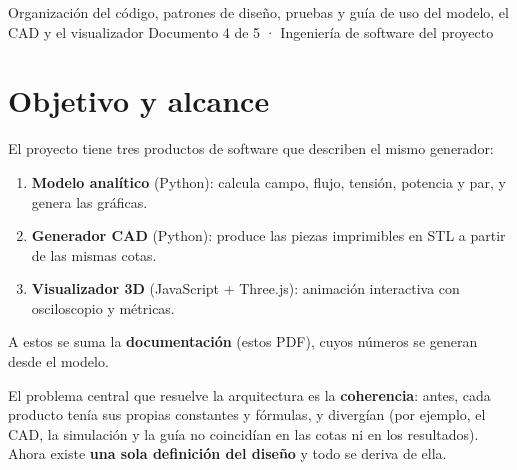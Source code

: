 \documentclass[11pt]{article}
\begin{document}
        {Organización del código, patrones de diseño, pruebas y guía de uso del modelo, el CAD y el visualizador}
        {Documento 4 de 5 · Ingeniería de software del proyecto}

\tableofcontents
\newpage

\section{Objetivo y alcance}
El proyecto tiene tres productos de software que describen el mismo generador:
\begin{enumerate}
  \item \textbf{Modelo analítico} (Python): calcula campo, flujo, tensión, potencia y par, y genera las gráficas.
  \item \textbf{Generador CAD} (Python): produce las piezas imprimibles en STL a partir de las mismas cotas.
  \item \textbf{Visualizador 3D} (JavaScript + Three.js): animación interactiva con osciloscopio y métricas.
\end{enumerate}
A estos se suma la \textbf{documentación} (estos PDF), cuyos números se generan desde el modelo.

El problema central que resuelve la arquitectura es la \textbf{coherencia}: antes, cada producto tenía sus
propias constantes y fórmulas, y divergían (por ejemplo, el CAD, la simulación y la guía no coincidían en las
cotas ni en los resultados). Ahora existe \textbf{una sola definición del diseño} y todo se deriva de ella.
\end{document}
